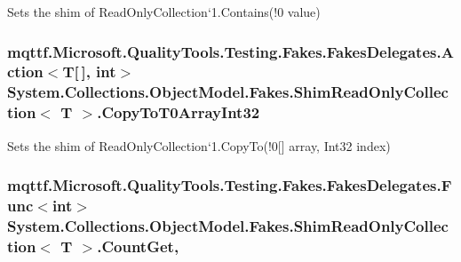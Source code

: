 Sets the shim of Read\-Only\-Collection`1.Contains(!0 value)

\hypertarget{class_system_1_1_collections_1_1_object_model_1_1_fakes_1_1_shim_read_only_collection_3_01_t_01_4_ac3f1cab7bdd86dcdcc2c9ef3f554c45e}{
\subsubsection[{Copy\-To\-T0\-Array\-Int32}]{\setlength{\rightskip}{0pt plus 5cm}mqttf.\-Microsoft.\-Quality\-Tools.\-Testing.\-Fakes.\-Fakes\-Delegates.\-Action$<$T\mbox{[}$\,$\mbox{]}, int$>$ System.\-Collections.\-Object\-Model.\-Fakes.\-Shim\-Read\-Only\-Collection$<$ T $>$.Copy\-To\-T0\-Array\-Int32\hspace{0.3cm}{\ttfamily [set]}}}\label{class_system_1_1_collections_1_1_object_model_1_1_fakes_1_1_shim_read_only_collection_3_01_t_01_4_ac3f1cab7bdd86dcdcc2c9ef3f554c45e}


Sets the shim of Read\-Only\-Collection`1.Copy\-To(!0\mbox{[}\mbox{]} array, Int32 index)

\hypertarget{class_system_1_1_collections_1_1_object_model_1_1_fakes_1_1_shim_read_only_collection_3_01_t_01_4_a4c8fa25ebcdb007aa4b785dfae732045}{
\subsubsection[{Count\-Get}]{\setlength{\rightskip}{0pt plus 5cm}mqttf.\-Microsoft.\-Quality\-Tools.\-Testing.\-Fakes.\-Fakes\-Delegates.\-Func$<$int$>$ System.\-Collections.\-Object\-Model.\-Fakes.\-Shim\-Read\-Only\-Collection$<$ T $>$.Count\-Get\hspace{0.3cm}{\ttfamily [get]}, {\ttfamily [set]}}}\label{class_system_1_1_collections_1_1_object_model_1_1_fakes_1_1_shim_read_only_collection_3_01_t_01_4_a4c8fa25ebcdb007aa4b785dfae732045}


